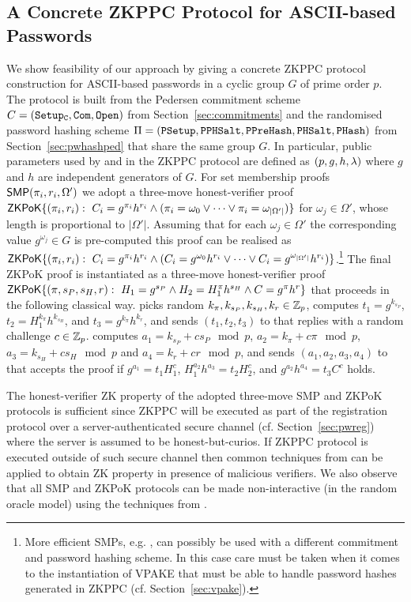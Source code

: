 \subsection{A Concrete ZKPPC Protocol for ASCII-based Passwords}\label{sec:instantiation}
We show feasibility of our approach by giving a concrete \ac{ZKPPC} protocol construction for \ac{ASCII}-based passwords in a cyclic group $G$ of prime order $p$. 
The protocol is built from the Pedersen commitment scheme $C=(\mathtt{Setup_C},\mathtt{Com},\mathtt{Open})$ from Section~\ref{sec:commitments} and the randomised password hashing scheme $\Pi=(\mathtt{PSetup},\allowbreak\mathtt{PPHSalt},\allowbreak\mathtt{PPreHash},\mathtt{PHSalt},\allowbreak\mathtt{PHash})$ from Section~\ref{sec:pwhashped} that share the same group $G$. 
In particular, public parameters used by \Client and \Server in the \ac{ZKPPC} protocol are defined as $(p,g,h,\lambda)$ where $g$ and $h$ are independent generators of $G$. 
For set membership proofs $\mathsf{SMP}(\pi_i,r_i,\Omega')$ we adopt a three-move honest-verifier proof $\mathsf{ZKPoK}\{(\pi_i,r_i):~ C_i=g^{\pi_i}h^{r_i} \wedge (\pi_i=\omega_0 \vee \dots \vee \pi_i=\omega_{|\Omega'|})\}$ for $\omega_j\in\Omega'$, whose length is proportional to $|\Omega'|$. 
Assuming that for each $\omega_j\in\Omega'$ the corresponding value $g^{\omega_j}\in G$ is pre-computed this proof can be realised as $\mathsf{ZKPoK}\{(\pi_i,r_i):~ C_i=g^{\pi_i}h^{r_i} \wedge (C_i=g^{\omega_0}h^{r_i} \vee \dots \vee C_i=g^{\omega_{|\Omega'|}}h^{r_i})\}$.\footnote{More efficient SMPs, e.g. \cite{CamenischCS08}, can possibly be used with a different commitment and password hashing scheme. 
In this case care must be taken when it comes to the instantiation of VPAKE that must be able to handle password hashes generated in \ac{ZKPPC} (cf. Section~\ref{sec:vpake}).}
The final ZKPoK proof is instantiated as a three-move honest-verifier proof $\mathsf{ZKPoK}\{(\pi, s_P, s_H, r):~ H_1=g^{s_P} \wedge H_2 = H_1^{\pi}h^{s_H} \wedge C = g^\pi h^{r}\}$ that proceeds in the following classical way. 
\Client picks random $k_\pi, k_{s_P}, k_{s_H}, k_{r}\in\mathbb{Z}_p$, computes $t_1=g^{k_{s_P}}$, $t_2=H_1^{k_\pi}h^{k_{s_H}}$, and $t_3=g^{k_\pi}h^{k_{r}}$, and sends $(t_1,t_2,t_3)$ to \Server that replies with a random challenge $c\in\mathbb{Z}_p$. \Client computes $a_1=k_{s_P}+cs_P\mod p$, $a_2=k_\pi+c\pi \mod p$, $a_3=k_{s_H}+cs_{H}\mod p$ and $a_4=k_{r}+cr\mod p$, and sends $(a_1,a_2,a_3,a_4)$ to \Server that accepts the proof if $g^{a_1}=t_1 H_1^{c}$, $H_1^{a_2}h^{a_3}=t_2H_2^c$, and $g^{a_2}h^{a_4}=t_3C^c$ holds.

\begin{remark}
The honest-verifier ZK property of the adopted three-move SMP and ZKPoK protocols is sufficient since \ac{ZKPPC} will be executed as part of the registration protocol over a server-authenticated secure channel (cf. Section~\ref{sec:pwreg}) where the server is assumed to be honest-but-curios. 
If \ac{ZKPPC} protocol is executed outside of such secure channel then common techniques from \cite{CramerDM00} can be applied to obtain ZK property in presence of malicious verifiers. 
We also observe that all SMP and ZKPoK protocols can be made non-interactive (in the random oracle model) using the techniques from \cite{FiatS86}.
\end{remark}


